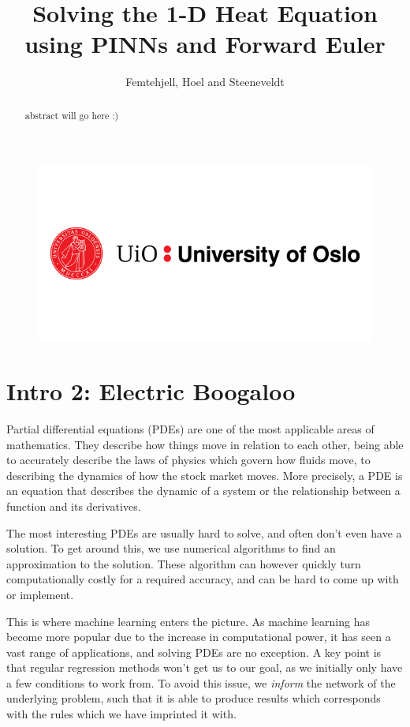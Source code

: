 \documentclass{article}
\title{Solving the 1-D Heat Equation using PINNs and Forward Euler}
\author{Femtehjell, Hoel and Steeneveldt}
\theoremstyle{definition}
\begin{document}

\maketitle
\begin{figure}[H]
    \centering
    \includegraphics[scale=0.5]{1797261_uio-logo.png}
\end{figure}
\newpage
\tableofcontents

\newpage
\listoffigures

\newpage

\begin{abstract}
    abstract will go here :)
\end{abstract}

\section{Intro 2: Electric Boogaloo}
Partial differential equations (PDEs) are one of the most applicable areas of mathematics. They describe how things move in relation to each other, being able to accurately describe the laws of physics which govern how fluids move, to describing the dynamics of how the stock market moves. More precisely, a PDE is an equation that describes the dynamic of a system or the relationship between a function and its derivatives.

The most interesting PDEs are usually hard to solve, and often don't even have a solution. To get around this, we use numerical algorithms to find an approximation to the solution. These algorithm can however quickly turn computationally costly for a required accuracy, and can be hard to come up with or implement.

This is where machine learning enters the picture. As machine learning has become more popular due to the increase in computational power, it has seen a vast range of applications, and solving PDEs are no exception. A key point is that regular regression methods won't get us to our goal, as we initially only have a few conditions to work from. To avoid this issue, we \textit{inform} the network of the underlying problem, such that it is able to produce results which corresponds with the rules which we have imprinted it with.
\end{document}
